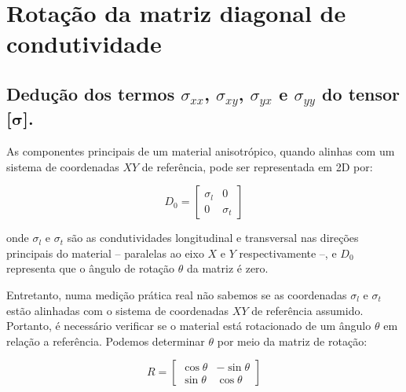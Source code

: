 \documentclass[
12pt,
a4paper,
oneside,
chapter=TITLE,
sumario=tradicional
]{abntex2}
\begin{document}
    


	



	
		\apendices
	\chapter{Rotação da matriz diagonal de condutividade}{\label{ApendiceA1_a}}
\section{Dedução dos termos $\sigma_{xx}$, $\sigma_{xy}$, $\sigma_{yx}$ e  $\sigma_{yy}$ do tensor [$\mathbf{\sigma}$].}{\label{ApendiceA1}}
	
As componentes principais de um material anisotrópico, quando alinhas com um sistema de coordenadas $XY$ de referência,   pode ser representada em 2D por:

	\begin{equation} %
	D_0 =  
	\begin{bmatrix}  
		\sigma_l & 0 \\  
		0 & \sigma_t  
	\end{bmatrix}  
	\label{eq:componentes_principais}
	\end{equation}

onde $\sigma_l$ e $\sigma_t$ são as condutividades longitudinal e transversal nas direções principais do material -- paralelas ao eixo $X$ e $Y$ respectivamente --, e $D_0$ representa que o ângulo de rotação $\theta$ da matriz é zero.

Entretanto, numa medição prática real não sabemos se as coordenadas $\sigma_l$ e $\sigma_t$ estão alinhadas com o sistema de coordenadas $XY$ de referência assumido. Portanto, é necessário  verificar se o material está rotacionado de um ângulo $\theta$ em relação a referência. Podemos determinar  $\theta$ por meio da matriz de rotação:

\begin{equation} %
	R =  
	\begin{bmatrix}  
		\cos\theta & -\sin\theta \\  
		\sin\theta & \cos\theta  
	\end{bmatrix} 
	\label{eq:matrizRotacao}
\end{equation}
\end{document}
